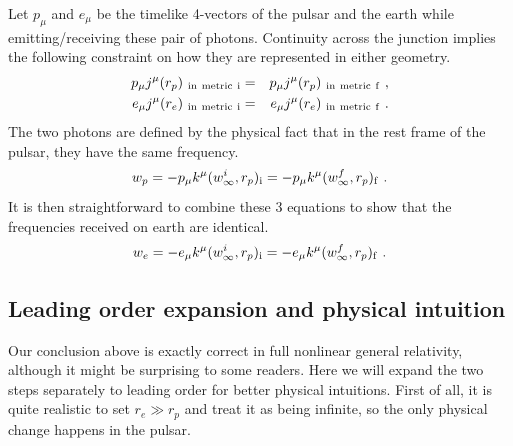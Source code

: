 \documentclass[aps,showpacs,twocolumn,floats,prd,superscriptaddress,nofootinbib]{revtex4-1}
\begin{document}
Let $p_\mu$ and $e_\mu$ be the timelike 4-vectors of the pulsar and the earth while emitting/receiving these pair of photons. Continuity across the junction implies the following constraint on how they are represented in either geometry.
\begin{eqnarray}
p_\mu j^\mu(r_p)_{\rm \ in \ metric \ i} &=& 
p_\mu j^\mu(r_p)_{\rm \ in \ metric \ f}~,
\label{eq-JuncPuls} \\ 
e_\mu j^\mu(r_e)_{\rm \ in \ metric \ i} &=& 
e_\mu j^\mu(r_e)_{\rm \ in \ metric \ f}~.
\end{eqnarray}
The two photons are defined by the physical fact that in the rest frame of the pulsar, they have the same frequency.
\begin{equation}
w_p = -p_\mu k^\mu(w^i_\infty, r_p)_{\rm i} = 
-p_\mu k^\mu(w^f_\infty, r_p)_{\rm f}~.
\label{eq-PulsEmit}
\end{equation}
It is then straightforward to combine these 3 equations to show that the frequencies received on earth are identical.
\begin{equation}
w_e = -e_\mu k^\mu(w^i_\infty, r_p)_{\rm i} = 
-e_\mu k^\mu(w^f_\infty, r_p)_{\rm f}~.
\end{equation}

\subsection{Leading order expansion and physical intuition}

Our conclusion above is exactly correct in full nonlinear general relativity, although it might be surprising to some readers. Here we will expand the two steps separately to leading order for better physical intuitions. First of all, it is quite realistic to set $r_e \gg r_p$ and treat it as being infinite, so the only physical change happens in the pulsar.
\end{document}
